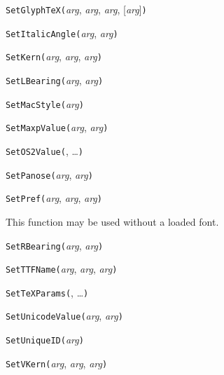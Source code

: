 \noindent\texttt{SetGlyphTeX(}\textit{arg}, \textit{arg}, \textit{arg}, [\textit{arg}]\texttt{)}


\noindent\texttt{SetItalicAngle(}\textit{arg}, \textit{arg}\texttt{)}


\noindent\texttt{SetKern(}\textit{arg}, \textit{arg}, \textit{arg}\texttt{)}


\noindent\texttt{SetLBearing(}\textit{arg}, \textit{arg}\texttt{)}


\noindent\texttt{SetMacStyle(}\textit{arg}\texttt{)}


\noindent\texttt{SetMaxpValue(}\textit{arg}, \textit{arg}\texttt{)}


\noindent\texttt{SetOS2Value(}, \ldots\texttt{)}


\noindent\texttt{SetPanose(}\textit{arg}, \textit{arg}\texttt{)}


\noindent\texttt{SetPref(}\textit{arg}, \textit{arg}, \textit{arg}\texttt{)}

This function may be used without a loaded font.


\noindent\texttt{SetRBearing(}\textit{arg}, \textit{arg}\texttt{)}


\noindent\texttt{SetTTFName(}\textit{arg}, \textit{arg}, \textit{arg}\texttt{)}


\noindent\texttt{SetTeXParams(}, \ldots\texttt{)}


\noindent\texttt{SetUnicodeValue(}\textit{arg}, \textit{arg}\texttt{)}


\noindent\texttt{SetUniqueID(}\textit{arg}\texttt{)}


\noindent\texttt{SetVKern(}\textit{arg}, \textit{arg}, \textit{arg}\texttt{)}

